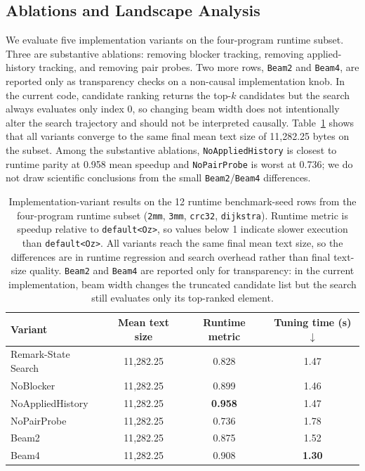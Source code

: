 \documentclass{article}
\newcommand{\method}{Remark-State Search}
\begin{document}
\subsection{Ablations and Landscape Analysis}

We evaluate five implementation variants on the four-program runtime subset. Three are substantive ablations: removing blocker tracking, removing applied-history tracking, and removing pair probes. Two more rows, \texttt{Beam2} and \texttt{Beam4}, are reported only as transparency checks on a non-causal implementation knob. In the current code, candidate ranking returns the top-$k$ candidates but the search always evaluates only index 0, so changing beam width does not intentionally alter the search trajectory and should not be interpreted causally. Table~\ref{tab:ablation} shows that all variants converge to the same final mean text size of 11{,}282.25 bytes on the subset. Among the substantive ablations, \texttt{NoAppliedHistory} is closest to runtime parity at 0.958 mean speedup and \texttt{NoPairProbe} is worst at 0.736; we do not draw scientific conclusions from the small \texttt{Beam2}/\texttt{Beam4} differences.

\begin{table}[t]
\caption{Implementation-variant results on the 12 runtime benchmark-seed rows from the four-program runtime subset (\texttt{2mm}, \texttt{3mm}, \texttt{crc32}, \texttt{dijkstra}). Runtime metric is speedup relative to \texttt{default<Oz>}, so values below 1 indicate slower execution than \texttt{default<Oz>}. All variants reach the same final mean text size, so the differences are in runtime regression and search overhead rather than final text-size quality. \texttt{Beam2} and \texttt{Beam4} are reported only for transparency: in the current implementation, beam width changes the truncated candidate list but the search still evaluates only its top-ranked element.}
\label{tab:ablation}
\centering
\small
\begin{tabular}{lccc}
\toprule
Variant & Mean text size & Runtime metric & Tuning time (s) $\downarrow$ \\
\midrule
\method{} & 11{,}282.25 & 0.828 & 1.47 \\
NoBlocker & 11{,}282.25 & 0.899 & 1.46 \\
NoAppliedHistory & 11{,}282.25 & \textbf{0.958} & 1.47 \\
NoPairProbe & 11{,}282.25 & 0.736 & 1.78 \\
Beam2 & 11{,}282.25 & 0.875 & 1.52 \\
Beam4 & 11{,}282.25 & 0.908 & \textbf{1.30} \\
\bottomrule
\end{tabular}
\end{table}
\end{document}
